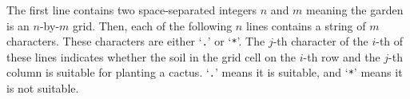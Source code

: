 The first line contains two space-separated integers $n$ and $m$
meaning the garden is an $n$-by-$m$ grid.
Then, each of the following $n$ lines contains a string of $m$ characters.
These characters are either `\verb+.+' or `\verb+*+'.
The $j$-th character of the $i$-th of these lines indicates whether
the soil in the grid cell on the $i$-th row and the $j$-th column is 
suitable for planting a cactus. 
`\verb+.+' means it is suitable, and `\verb+*+' means it is not suitable.

